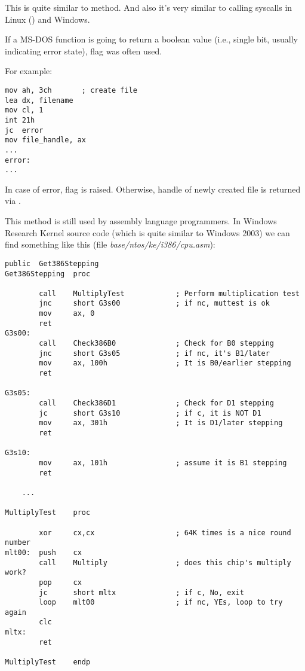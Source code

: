 This is quite similar to  method.
And also it's very similar to calling syscalls in Linux () and Windows.

If a MS-DOS function is going to return a boolean value (i.e., single bit, usually indicating error state),
 flag was often used.

For example:

\begin{lstlisting}[style=customasmx86]
mov ah, 3ch       ; create file
lea dx, filename
mov cl, 1
int 21h
jc  error
mov file_handle, ax
...
error:
...
\end{lstlisting}

In case of error,  flag is raised. Otherwise, handle of newly created file is returned via .

This method is still used by assembly language programmers.
In Windows Research Kernel source code (which is quite similar to Windows 2003) we can find something like this
(file \emph{base/ntos/ke/i386/cpu.asm}):

\begin{lstlisting}[style=customasmx86]
        public  Get386Stepping
Get386Stepping  proc

        call    MultiplyTest            ; Perform multiplication test
        jnc     short G3s00             ; if nc, muttest is ok
        mov     ax, 0
        ret
G3s00:
        call    Check386B0              ; Check for B0 stepping
        jnc     short G3s05             ; if nc, it's B1/later
        mov     ax, 100h                ; It is B0/earlier stepping
        ret

G3s05:
        call    Check386D1              ; Check for D1 stepping
        jc      short G3s10             ; if c, it is NOT D1
        mov     ax, 301h                ; It is D1/later stepping
        ret

G3s10:
        mov     ax, 101h                ; assume it is B1 stepping
        ret

	...

MultiplyTest    proc

        xor     cx,cx                   ; 64K times is a nice round number
mlt00:  push    cx
        call    Multiply                ; does this chip's multiply work?
        pop     cx
        jc      short mltx              ; if c, No, exit
        loop    mlt00                   ; if nc, YEs, loop to try again
        clc
mltx:
        ret

MultiplyTest    endp
\end{lstlisting}

